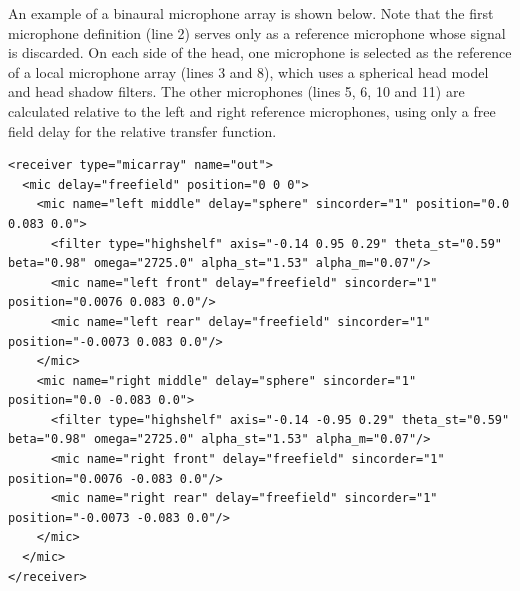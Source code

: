 An example of a binaural microphone array is shown below. Note that
the first microphone definition (line 2) serves only as a reference
microphone whose signal is discarded. On each side of the head, one
microphone is selected as the reference of a local microphone array
(lines 3 and 8), which uses a spherical head model and head shadow
filters. The other microphones (lines 5, 6, 10 and 11) are calculated
relative to the left and right reference microphones, using only a
free field delay for the relative transfer function.
\begin{lstlisting}
<receiver type="micarray" name="out">
  <mic delay="freefield" position="0 0 0">
    <mic name="left middle" delay="sphere" sincorder="1" position="0.0 0.083 0.0">
      <filter type="highshelf" axis="-0.14 0.95 0.29" theta_st="0.59" beta="0.98" omega="2725.0" alpha_st="1.53" alpha_m="0.07"/>
      <mic name="left front" delay="freefield" sincorder="1" position="0.0076 0.083 0.0"/>
      <mic name="left rear" delay="freefield" sincorder="1" position="-0.0073 0.083 0.0"/>
    </mic>
    <mic name="right middle" delay="sphere" sincorder="1" position="0.0 -0.083 0.0">
      <filter type="highshelf" axis="-0.14 -0.95 0.29" theta_st="0.59" beta="0.98" omega="2725.0" alpha_st="1.53" alpha_m="0.07"/>
      <mic name="right front" delay="freefield" sincorder="1" position="0.0076 -0.083 0.0"/>
      <mic name="right rear" delay="freefield" sincorder="1" position="-0.0073 -0.083 0.0"/>
    </mic>
  </mic>
</receiver>
\end{lstlisting}
